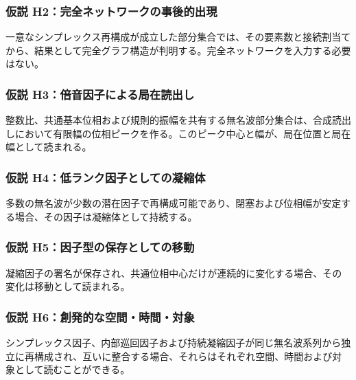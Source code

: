 \documentclass[
  a4paper,
]{ltjsarticle}
\begin{document}
\subsubsection{仮説
H2：完全ネットワークの事後的出現}\label{ux4eeeux8aac-h2ux5b8cux5168ux30cdux30c3ux30c8ux30efux30fcux30afux306eux4e8bux5f8cux7684ux51faux73fe}

一意なシンプレックス再構成が成立した部分集合では、その要素数と接続割当てから、結果として完全グラフ構造が判明する。完全ネットワークを入力する必要はない。

\subsubsection{仮説
H3：倍音因子による局在読出し}\label{ux4eeeux8aac-h3ux500dux97f3ux56e0ux5b50ux306bux3088ux308bux5c40ux5728ux8aadux51faux3057}

整数比、共通基本位相および規則的振幅を共有する無名波部分集合は、合成読出しにおいて有限幅の位相ピークを作る。このピーク中心と幅が、局在位置と局在幅として読まれる。

\subsubsection{仮説
H4：低ランク因子としての凝縮体}\label{ux4eeeux8aac-h4ux4f4eux30e9ux30f3ux30afux56e0ux5b50ux3068ux3057ux3066ux306eux51ddux7e2eux4f53}

多数の無名波が少数の潜在因子で再構成可能であり、閉塞および位相幅が安定する場合、その因子は凝縮体として持続する。

\subsubsection{仮説
H5：因子型の保存としての移動}\label{ux4eeeux8aac-h5ux56e0ux5b50ux578bux306eux4fddux5b58ux3068ux3057ux3066ux306eux79fbux52d5}

凝縮因子の署名が保存され、共通位相中心だけが連続的に変化する場合、その変化は移動として読まれる。

\subsubsection{仮説
H6：創発的な空間・時間・対象}\label{ux4eeeux8aac-h6ux5275ux767aux7684ux306aux7a7aux9593ux6642ux9593ux5bfeux8c61}

シンプレックス因子、内部巡回因子および持続凝縮因子が同じ無名波系列から独立に再構成され、互いに整合する場合、それらはそれぞれ空間、時間および対象として読むことができる。
\end{document}
